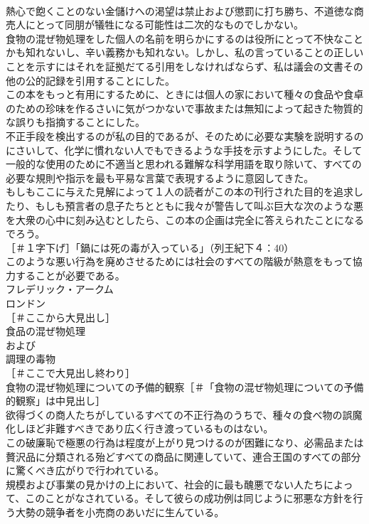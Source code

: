 \documentclass[8pt]{extreport}
\begin{document}
\begin{CJK}{UTF8}{min}
\\	熱心で飽くことのない金儲けへの渇望は禁止および懲罰に打ち勝ち、不道徳な商売人にとって同朋が犠牲になる可能性は二次的なものでしかない。
\\	食物の混ぜ物処理をした個人の名前を明らかにするのは役所にとって不快なことかも知れないし、辛い義務かも知れない。しかし、私の言っていることの正しいことを示すにはそれを証拠だてる引用をしなければならず、私は議会の文書その他の公的記録を引用することにした。
\\	この本をもっと有用にするために、ときには個人の家において種々の食品や食卓のための珍味を作るさいに気がつかないで事故または無知によって起きた物質的な誤りも指摘することにした。
\\	不正手段を検出するのが私の目的であるが、そのために必要な実験を説明するのにさいして、化学に慣れない人でもできるような手技を示すようにした。そして一般的な使用のために不適当と思われる難解な科学用語を取り除いて、すべての必要な規則や指示を最も平易な言葉で表現するように意図してきた。
\\	もしもここに与えた見解によって１人の読者がこの本の刊行された目的を追求したり、もしも預言者の息子たちとともに我々が警告して叫ぶ巨大な次のような悪を大衆の心中に刻み込むとしたら、この本の企画は完全に答えられたことになるでろう。
\\	［＃１字下げ］「鍋には死の毒が入っている」（列王紀下４：40）
\\	このような悪い行為を廃めさせるためには社会のすべての階級が熱意をもって協力することが必要である。
\\	フレデリック・アークム
\\	ロンドン
\\	［＃ここから大見出し］
\\	食品の混ぜ物処理
\\	および
\\	調理の毒物
\\	［＃ここで大見出し終わり］
\\	食物の混ぜ物処理についての予備的観察［＃「食物の混ぜ物処理についての予備的観察」は中見出し］
\\	欲得づくの商人たちがしているすべての不正行為のうちで、種々の食べ物の誤魔化しほど非難すべきであり広く行き渡っているものはない。
\\	この破廉恥で極悪の行為は程度が上がり見つけるのが困難になり、必需品または贅沢品に分類される殆どすべての商品に関連していて、連合王国のすべての部分に驚くべき広がりで行われている。
\\	規模および事業の見かけの上において、社会的に最も醜悪でない人たちによって、このことがなされている。そして彼らの成功例は同じように邪悪な方針を行う大勢の競争者を小売商のあいだに生んている。

\end{CJK}
\end{document}
